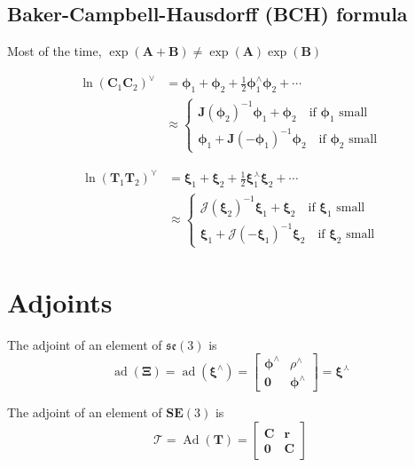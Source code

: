 \documentclass[12pt,landscape,a4paper]{article}
\newcommand{\SE}{\mathrm{\mathbf{SE}}}
\newcommand{\se}{\mathfrak{se}}
\newcommand{\vzero}{\bm{0}}
\newcommand{\C}{\bm{C}}
\newcommand{\T}{\bm{T}}
\newcommand{\aT}{\bm{\mathcal{T}}}
\newcommand{\J}{\bm{J}}
\newcommand{\Jc}{\bm{\mathcal{J}}}
\newcommand{\bphi}{\bm{\phi}}
\newcommand{\bxi}{\bm{\xi}}
\newcommand{\bXi}{\bm{\Xi}}
\DeclareMathOperator{\Ad}{Ad}
\DeclareMathOperator{\ad}{ad}
\begin{document}
\begin{multicols*}{3}
\subsection*{Baker-Campbell-Hausdorff (BCH) formula}
Most of the time, $\exp(\mathbf{A}+\mathbf{B}) \not= \exp(\mathbf{A})\exp(\mathbf{B})$

	$$\begin{aligned} \ln(\C_1\C_2)^\vee%
	&= \bphi_1 + \bphi_2 + \frac12 \bphi_1^\wedge\bphi_2 + \cdots \\%
	&\approx
	\begin{cases}
		\J(\bphi_2)^{-1}\bphi_1 + \bphi_2 \quad\text{if $\bphi_1$ small} \\
		\bphi_1 + \J(-\bphi_1)^{-1}\bphi_2  \quad\text{if $\bphi_2$ small}
	\end{cases}
	\end{aligned}$$

	$$\begin{aligned} \ln(\T_1\T_2)^\curlyvee%
	&= \bxi_1 + \bxi_2 + \frac12 \bxi_1^\curlywedge\bxi_2 + \cdots \\%
	&\approx
	\begin{cases}
		\Jc(\bxi_2)^{-1}\bxi_1 + \bxi_2 \quad\text{if $\bxi_1$ small} \\
		\bxi_1 + \Jc(-\bxi_1)^{-1}\bxi_2  \quad\text{if $\bxi_2$ small}
	\end{cases}
	\end{aligned}$$

\section{Adjoints}
	The adjoint of an element of $\se(3)$ is
	$$ \ad(\bXi) = \ad(\bxi^\wedge) = %
	\begin{bmatrix}
		\bphi^\wedge & \rho^\wedge \\
		\vzero & \bphi^\wedge
	\end{bmatrix} = 
	\bxi^\curlywedge$$

	The adjoint of an element of $\SE(3)$ is
	$$ \aT = \Ad(\T) =%
	\begin{bmatrix}
		\C & \mathbf{r} \\
		\vzero & \C
	\end{bmatrix}$$


\end{multicols*}
\end{document}
